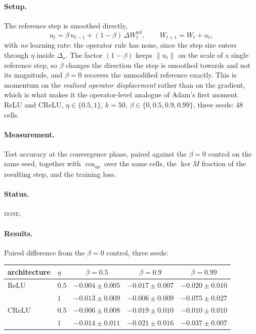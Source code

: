 \documentclass{article} %
\theoremstyle{plain}
\theoremstyle{definition}
\theoremstyle{remark}
\begin{document}
\paragraph{Setup.}
The reference step is smoothed directly,
\begin{equation}
  u_t = \beta\, u_{t-1} + (1-\beta)\, \Delta W^{\mathrm{ref}}_t, \qquad W_{t+1} = W_t + u_t ,
  \label{eq:opmom}
\end{equation}
with \emph{no} learning rate: the operator rule has none, since the step size enters through $\eta$
inside $\Delta_\star$. The factor $(1-\beta)$ keeps $\|u_t\|$ on the scale of a single reference
step, so $\beta$ changes the direction the step is smoothed towards and not its magnitude, and
$\beta = 0$ recovers the unmodified reference exactly. This is momentum on the \emph{realised
operator displacement} rather than on the gradient, which is what makes it the operator-level
analogue of Adam's first moment. ReLU and CReLU, $\eta \in \{0.5, 1\}$, $k = 50$,
$\beta \in \{0, 0.5, 0.9, 0.99\}$, three seeds: $48$ cells.

\paragraph{Measurement.}
Test accuracy at the convergence phase, paired against the $\beta = 0$ control on the same seed,
together with $\cos_{op}$ over the same cells, the $\ker M$ fraction of the resulting step, and the
training loss.

\paragraph{Status.} \textsc{done}.

\paragraph{Results.} Paired difference from the $\beta = 0$ control, three seeds:

\begin{center}\small
\begin{tabular}{llccc}
\toprule
architecture & $\eta$ & $\beta = 0.5$ & $\beta = 0.9$ & $\beta = 0.99$ \\
\midrule
ReLU  & $0.5$ & $-0.004 \pm 0.005$ & $-0.017 \pm 0.007$ & $-0.020 \pm 0.010$ \\
      & $1$   & $-0.013 \pm 0.009$ & $-0.006 \pm 0.009$ & $\mathbf{-0.075 \pm 0.027}$ \\
CReLU & $0.5$ & $-0.006 \pm 0.008$ & $-0.019 \pm 0.010$ & $-0.010 \pm 0.010$ \\
      & $1$   & $-0.014 \pm 0.011$ & $-0.021 \pm 0.016$ & $\mathbf{-0.037 \pm 0.007}$ \\
\bottomrule
\end{tabular}
\end{center}
\end{document}
